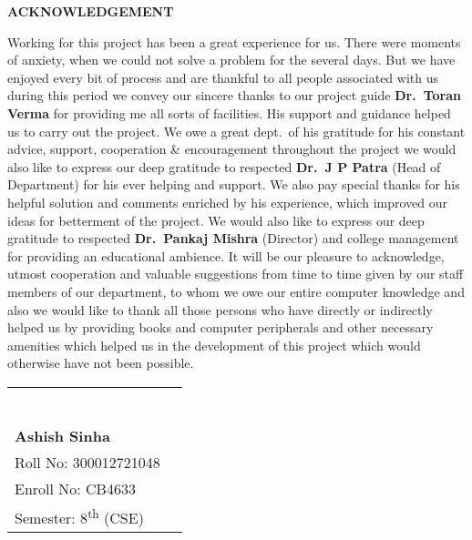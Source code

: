
\vspace{-0.5cm}

\begin{center}
  \Large\textbf{ACKNOWLEDGEMENT}
\end{center}
\vspace{-0.5cm}
\begin{justify}
  \linespread{1.5}
  \normalsize
  Working for this project has been a great experience for us. There were moments of anxiety, when we could not solve a problem for the several days. But we have enjoyed every bit of process and are thankful to all people associated with us during this period we convey our sincere thanks to our project guide \textbf{Dr.\ Toran Verma} for providing me all sorts of facilities. His support and guidance helped us to carry out the project. We owe a great dept.\ of his gratitude for his constant advice, support, cooperation \& encouragement throughout the project we would also like to express our deep gratitude to respected \textbf{Dr.\ J P Patra} (Head of Department) for his ever helping and support. We also pay special thanks for his helpful solution and comments enriched by his experience, which improved our ideas for betterment of the project. We would also like to express our deep gratitude to respected \textbf{Dr.\ Pankaj Mishra} (Director) and college management for providing an educational ambience. It will be our pleasure to acknowledge, utmost cooperation and valuable suggestions from time to time given by our staff members of our department, to whom we owe our entire computer knowledge and also we would like to thank all those persons who have directly or indirectly helped us by providing books and computer peripherals and other necessary amenities which helped us in the development of this project which would otherwise have not been possible.
\end{justify}



\vspace{0.5cm}
\normalsize

\noindent
\begin{tabular}{p{} @{\hspace{2cm}} p{}}
   &
  \centering
  \rule{4cm}{0.4pt}     \\
  \textbf{Ashish Sinha} \\
  Roll No: 300012721048 \\
  Enroll No: CB4633     \\
  Semester: 8\textsuperscript{th} (CSE)
\end{tabular}

